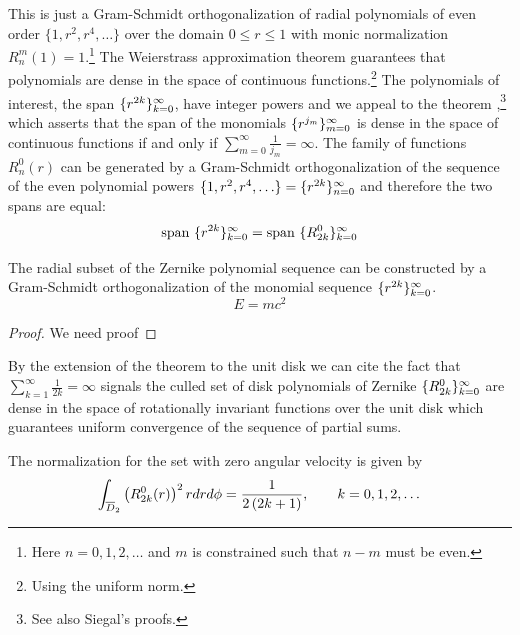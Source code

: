 \documentclass[preprint,12pt]{elsarticle}
\begin{document}
This is just a Gram-Schmidt orthogonalization of radial polynomials of even order $\{1,r^{2},r^{4},\dots\}$ over the domain $0\le r\le1$ with monic normalization $R_{n}^{m}(1)=1$.\footnote{Here $n=0,1,2,\dots$ and $m$ is constrained such that $n-m$ must be even.} The Weierstrass approximation theorem guarantees that polynomials are dense in the space of continuous functions.\footnote{Using the uniform norm.} The polynomials of interest, the span $\lbrace r^{2k} \rbrace_{k=0}^{\infty}$, have integer powers and we appeal to the \mst theorem \cite[p. 88]{Lax},\footnote{See also Siegal's \cite{Siegal} proofs.} which asserts that the span of the monomials $\lbrace r^{j_{m}} \rbrace_{m=0}^{\infty}$ is dense in the space of continuous functions if and only if $\sum_{m=0}^{\infty}\frac{1}{j_{m}} = \infty$.
%
The family of functions $R_{n}^{0}(r)$ can be generated by a Gram-Schmidt orthogonalization of the sequence of the even polynomial powers $\lst{1,r^{2},r^{4},\dots} = \lst{r^{2k}}_{n=0}^{\infty}$ and therefore the two spans are equal:
  \begin{equation}
    \text{span } \lbrace r^{2k} \rbrace_{k=0}^{\infty} = \text{span } \lbrace R_{2k}^{0} \rbrace_{k=0}^{\infty}
  \end{equation}	
{\color{blue}
\begin{myTheorem}  %
The radial subset of the Zernike polynomial sequence can be constructed by a Gram-Schmidt orthogonalization of the monomial sequence $\lbrace r^{2k} \rbrace_{k=0}^{\infty}$.
  \begin{equation}
    E = mc^{2}
  \end{equation}	
\end{myTheorem}  %
\begin{proof}  %
  We need proof
\end{proof}  %
}
By the extension of the \mst theorem to the unit disk \cite{ms} we can cite the fact that $\sum_{k=1}^{\infty}\frac{1}{2k} = \infty$ signals the culled set of disk polynomials of Zernike $\lbrace R_{2k}^{0} \rbrace_{k=0}^{\infty}$ are dense in the space of rotationally invariant functions over the unit disk which guarantees uniform convergence of the sequence of partial sums.

The normalization for the set with zero angular velocity is given by
  \begin{equation}
      \int_{\overline{D}_{2}} \left( R_{2k}^{0}(r) \right)^{2} r dr d\phi = \frac{1} { 2\left( 2k + 1 \right) }, \qquad k = 0, 1, 2, \dots
  \end{equation}
\end{document}
